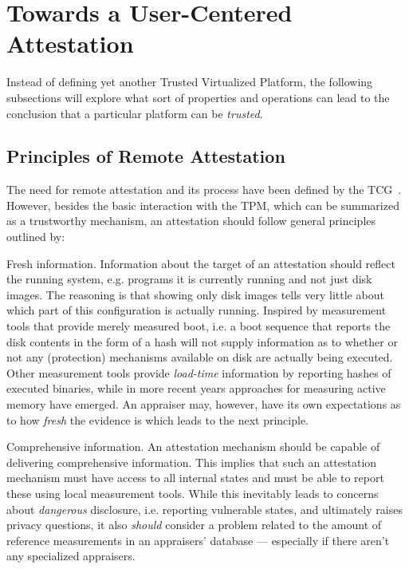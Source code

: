 \section{Towards a User-Centered Attestation}

Instead of defining yet another Trusted Virtualized Platform, the following subsections will explore what sort of properties and operations can lead to the conclusion that a particular platform can be \emph{trusted}.

\subsection{Principles of Remote Attestation}

The need for remote attestation and its process have been defined by the TCG~\cite{VTPA,ISOTPM}. However, besides the basic interaction with the TPM, which can be summarized as a trustworthy mechanism, an attestation should follow general principles outlined by\cite{RA}: 

\begin{prince}\label{pri:1} Fresh information. Information about the target of an attestation should reflect the running system, e.g. programs it is currently running and not just disk images. The reasoning is that showing only disk images tells very little about which part of this configuration is actually running. Inspired by measurement tools that provide merely measured boot, i.e. a boot sequence that reports the disk contents in the form of a hash will not supply information as to whether or not any (protection) mechanisms available on disk are actually being executed. Other measurement tools provide \emph{load-time} information by reporting hashes of executed binaries, while in more recent years approaches for measuring active memory have emerged. An appraiser may, however, have its own expectations as to how \emph{fresh} the evidence is which leads to the next principle. 
\end{prince}

\begin{prince}\label{pri:2} Comprehensive information. An attestation mechanism should be capable of delivering comprehensive information. This implies that such an attestation mechanism must have access to all internal states and must be able to report these using local measurement tools. While this inevitably leads to concerns about \emph{dangerous} disclosure, i.e. reporting vulnerable states, and ultimately raises privacy questions, it also \emph{should} consider a problem related to the amount of reference measurements in an appraisers' database --- especially if there aren't any specialized appraisers.
\end{prince}

